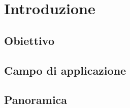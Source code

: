 \chapter{Introduzione}
\section{Obiettivo}


\section{Campo di applicazione}


\section{Panoramica}

